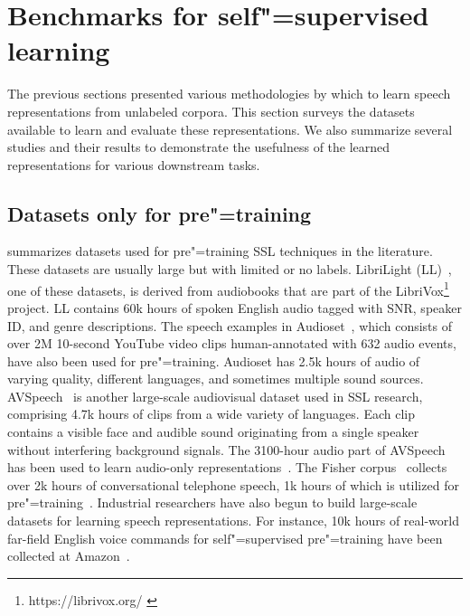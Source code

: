 
\section{Benchmarks for self"=supervised learning}
\label{section:benchmark}

The previous sections presented various methodologies by which to learn speech
representations from unlabeled corpora. This section surveys the datasets
available to learn and evaluate these representations. We also summarize
several studies and their results to demonstrate the usefulness of the learned
representations for various downstream tasks. 

\subsection{Datasets only for pre"=training} 
 summarizes datasets used for pre"=training SSL techniques
in the literature. These datasets are usually large but with limited or no
labels. LibriLight (LL)~\parencite{kahn_libri-light_2020}, one of these datasets, is
derived from audiobooks that are part of the
LibriVox\footnote{https://librivox.org/ \label{librivox}} project. LL contains
60k hours of spoken English audio tagged with SNR, speaker ID, and genre
descriptions. The speech examples in Audioset~\parencite{gemmeke_audio_2017}, which
consists of over 2M 10-second YouTube video clips human-annotated with 632
audio events, have also been used for pre"=training. Audioset has 2.5k hours
of audio of varying quality, different languages, and sometimes multiple sound
sources. AVSpeech~\parencite{ephrat_looking_2018} is another large-scale audiovisual
dataset used in SSL research, comprising 4.7k hours of clips from a wide
variety of languages. 
Each clip contains a visible face and audible sound originating from a single
speaker without interfering background signals. The 3100-hour audio part of
AVSpeech has been used to learn audio-only 
representations~\parencite{kawakami_learning_2020}. The Fisher corpus~\parencite{cieri_fisher_2004} collects
over 2k hours of conversational telephone speech, 1k hours of which is utilized
for pre"=training~\parencite{jiang_further_2021}. Industrial researchers have also
begun to build large-scale datasets for learning speech representations.
For instance, 10k hours of real-world far-field English voice commands for
self"=supervised pre"=training have been collected at 
Amazon~\parencite{sadhu_wav2vecc_2021}. 

